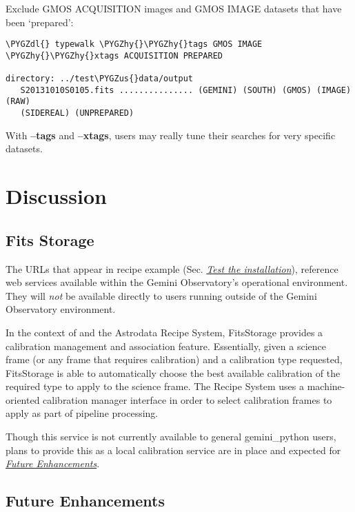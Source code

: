\documentclass[letterpaper,10pt,english]{sphinxmanual}
\def\PYGZus{\char`\_}
\def\PYGZdl{\char`\$}
\def\PYGZhy{\char`\-}
\begin{document}
Exclude GMOS ACQUISITION images and GMOS IMAGE datasets that have been
`prepared':

\begin{Verbatim}[commandchars=\\\{\}]
\PYGZdl{} typewalk \PYGZhy{}\PYGZhy{}tags GMOS IMAGE \PYGZhy{}\PYGZhy{}xtags ACQUISITION PREPARED

directory: ../test\PYGZus{}data/output
   S20131010S0105.fits ............... (GEMINI) (SOUTH) (GMOS) (IMAGE) (RAW)
   (SIDEREAL) (UNPREPARED)
\end{Verbatim}

With \textbf{--tags} and \textbf{--xtags}, users may really tune their searches for very
specific datasets.


\chapter{Discussion}
\label{discuss:discussion}\label{discuss::doc}

\section{Fits Storage}
\label{discuss:fits-storage}\label{discuss:fitsstore}
The URLs that appear in  recipe example (Sec. {\hyperref[userenv:test]{\emph{Test the installation}}}), reference
web services available within the Gemini Observatory's operational environment.
They will \emph{not} be available directly to users running  outside of the
Gemini Observatory environment.

In the context of  and the Astrodata Recipe System, FitsStorage provides
a calibration management and association feature. Essentially, given a science
frame (or any frame that requires calibration) and a calibration
type requested, FitsStorage is able to automatically choose the best available
calibration of the required type to apply to the science frame. The Recipe System
uses a machine-oriented calibration manager interface in order to select
calibration frames to apply as part of pipeline processing.

Though this service is not currently available to general gemini\_python users,
plans to provide this as a local calibration service are in place and expected
for {\hyperref[discuss:future]{\emph{Future Enhancements}}}.


\section{Future Enhancements}
\label{discuss:future}\label{discuss:future-enhancements}
\end{document}
